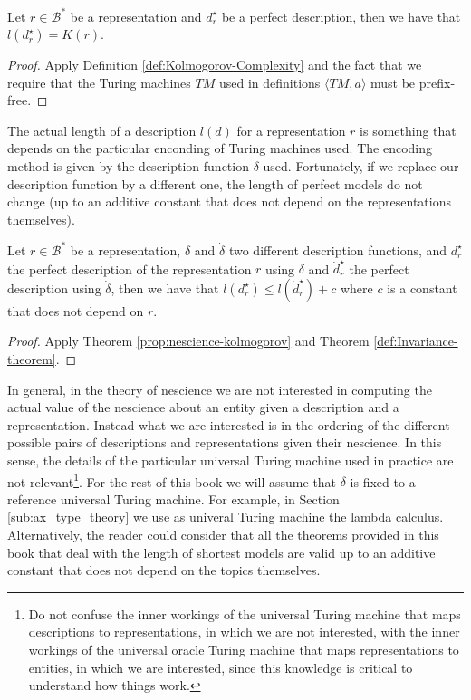 \begin{proposition}
\label{prop:nescience-kolmogorov}
Let $r \in \mathcal{B}^\ast$ be a representation and $d_r^{\star}$ be a perfect description, then we have that $l \left( d_r^{\star} \right) = K\left( r \right)$.
\end{proposition}
\begin{proof}
Apply Definition \ref{def:Kolmogorov-Complexity} and the fact that we require that the Turing machines $TM$ used in definitions $\langle TM,a\rangle$ must be prefix-free.
\end{proof}

The actual length of a description $l \left( d \right)$ for a representation $r$ is something that depends on the particular enconding of Turing machines used. The encoding method is given by the description function $\delta$ used. Fortunately, if we replace our description function by a different one, the length of perfect models do not change (up to an additive constant that does not depend on the representations themselves).

\begin{corollary}
Let $r \in \mathcal{B}^\ast$ be a representation, $\delta$ and $\dot{\delta}$ two different description functions, and $d_r^{\star}$ the perfect description of the representation $r$ using $\delta$ and $\dot{d}_r^{\star}$ the perfect description using $\dot{\delta}$, then we have that $l \left( d_r^{\star} \right) \leq l \left( \dot{d}_r^{\star} \right) + c$ where $c$ is a constant that does not depend on $r$.
\end{corollary}
\begin{proof}
Apply Theorem \ref{prop:nescience-kolmogorov} and Theorem \ref{def:Invariance-theorem}.
\end{proof}

In general, in the theory of nescience we are not interested in computing the actual value of the nescience about an entity given a description and a representation. Instead what we are interested is in the ordering of the different possible pairs of descriptions and representations given their nescience. In this sense, the details of the particular universal Turing machine used in practice are not relevant\footnote{Do not confuse the inner workings of the universal Turing machine that maps descriptions to representations, in which we are not interested, with the inner workings of the universal oracle Turing machine that maps representations to entities, in which we are interested, since this knowledge is critical to understand how things work.}. For the rest of this book we will assume that $\delta$ is fixed to a reference universal Turing machine. For example, in Section \ref{sub:ax_type_theory} we use as univeral Turing machine the lambda calculus. Alternatively, the reader could consider that all the theorems provided in this book that deal with the length of shortest models are valid up to an additive constant that does not depend on the topics themselves.

